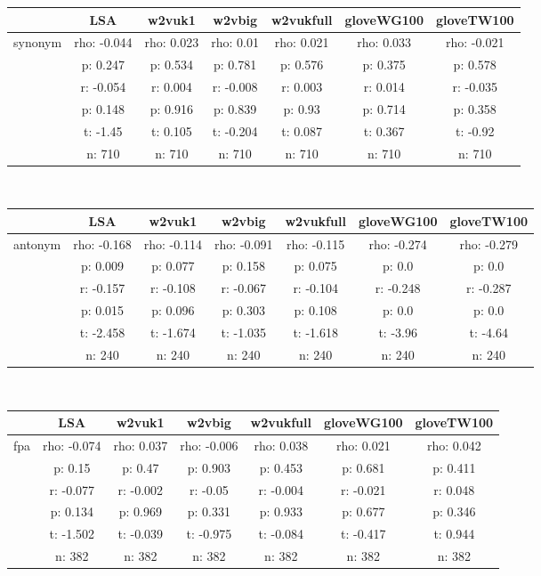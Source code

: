 \documentclass{article}
\begin{document}
\begin{tabular}{ccccccc|}\cline{2-7}
&\multicolumn{1}{|c}{LSA} & w2vuk1 & w2vbig & w2vukfull & gloveWG100 & gloveTW100 \\\hline
\multicolumn{1}{|c|}{\multirow{6}{*}{synonym}} & rho: -0.044 & rho: 0.023 & rho: 0.01 & rho: 0.021 & rho: 0.033 & rho: -0.021 \\
\multicolumn{1}{|c|}{} & p: 0.247 & p: 0.534 & p: 0.781 & p: 0.576 & p: 0.375 & p: 0.578 \\
\multicolumn{1}{|c|}{} & r: -0.054 & r: 0.004 & r: -0.008 & r: 0.003 & r: 0.014 & r: -0.035 \\
\multicolumn{1}{|c|}{} & p: 0.148 & p: 0.916 & p: 0.839 & p: 0.93 & p: 0.714 & p: 0.358 \\
\multicolumn{1}{|c|}{} & t: -1.45 & t: 0.105 & t: -0.204 & t: 0.087 & t: 0.367 & t: -0.92 \\
\multicolumn{1}{|c|}{} & n: 710 & n: 710 & n: 710 & n: 710 & n: 710 & n: 710 \\
\hline
\end{tabular}\\
\begin{tabular}{ccccccc|}\cline{2-7}
&\multicolumn{1}{|c}{LSA} & w2vuk1 & w2vbig & w2vukfull & gloveWG100 & gloveTW100 \\\hline
\multicolumn{1}{|c|}{\multirow{6}{*}{antonym}} & rho: -0.168 & rho: -0.114 & rho: -0.091 & rho: -0.115 & rho: -0.274 & rho: -0.279 \\
\multicolumn{1}{|c|}{} & p: 0.009 & p: 0.077 & p: 0.158 & p: 0.075 & p: 0.0 & p: 0.0 \\
\multicolumn{1}{|c|}{} & r: -0.157 & r: -0.108 & r: -0.067 & r: -0.104 & r: -0.248 & r: -0.287 \\
\multicolumn{1}{|c|}{} & p: 0.015 & p: 0.096 & p: 0.303 & p: 0.108 & p: 0.0 & p: 0.0 \\
\multicolumn{1}{|c|}{} & t: -2.458 & t: -1.674 & t: -1.035 & t: -1.618 & t: -3.96 & t: -4.64 \\
\multicolumn{1}{|c|}{} & n: 240 & n: 240 & n: 240 & n: 240 & n: 240 & n: 240 \\
\hline
\end{tabular}\\
\begin{tabular}{ccccccc|}\cline{2-7}
&\multicolumn{1}{|c}{LSA} & w2vuk1 & w2vbig & w2vukfull & gloveWG100 & gloveTW100 \\\hline
\multicolumn{1}{|c|}{\multirow{6}{*}{fpa}} & rho: -0.074 & rho: 0.037 & rho: -0.006 & rho: 0.038 & rho: 0.021 & rho: 0.042 \\
\multicolumn{1}{|c|}{} & p: 0.15 & p: 0.47 & p: 0.903 & p: 0.453 & p: 0.681 & p: 0.411 \\
\multicolumn{1}{|c|}{} & r: -0.077 & r: -0.002 & r: -0.05 & r: -0.004 & r: -0.021 & r: 0.048 \\
\multicolumn{1}{|c|}{} & p: 0.134 & p: 0.969 & p: 0.331 & p: 0.933 & p: 0.677 & p: 0.346 \\
\multicolumn{1}{|c|}{} & t: -1.502 & t: -0.039 & t: -0.975 & t: -0.084 & t: -0.417 & t: 0.944 \\
\multicolumn{1}{|c|}{} & n: 382 & n: 382 & n: 382 & n: 382 & n: 382 & n: 382 \\
\hline
\end{tabular}\\
\end{document}
